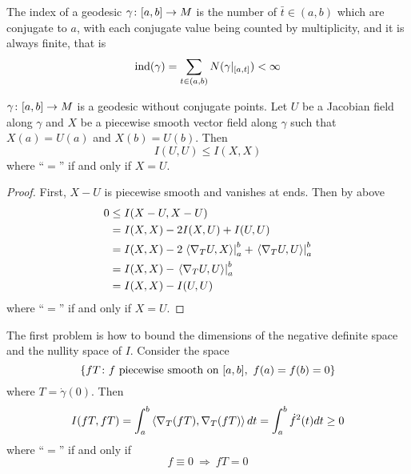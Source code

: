 \begin{enumerate}[label=\arabic{*}.]
	\begin{thm}\label{thm:morseindex}
		The index of a geodesic $\gamma \colon [a,b] \rightarrow M$ is the number of $\bar{t} \in (a,b)$ which are conjugate to $a$, with each conjugate value being counted by multiplicity, and it is always finite, that is
		\begin{equation*}
			\operatorname{ind}(\gamma) = \sum_{t \in (a,b)} N(\gamma|_{[a,t]}) < \infty
		\end{equation*}
	\end{thm}
	\begin{lem}\label{lem:indexlem}
		$\gamma \colon [a,b] \rightarrow M$ is a geodesic without conjugate points. Let $U$ be a Jacobian field along $\gamma$ and $X$ be a piecewise smooth vector field along $\gamma$ such that $X(a) = U(a)$ and $X(b) = U(b)$. Then
		\begin{equation*}
			I(U,U) \leq I(X,X)
		\end{equation*}
		where ``$=$'' if and only if $X = U$.
	\end{lem}
	\begin{proof}
		First, $X-U$ is piecewise smooth and vanishes at ends. Then by above
		\begin{equation*}
			\begin{aligned}
				0 &\leq I(X-U,X-U) \\
				&=I(X,X) - 2I(X,U)+I(U,U)\\
				&=I(X,X) - 2\left.\left\langle \nabla_TU,X \right\rangle\right\lvert_a^b + \left.\left\langle \nabla_TU,U \right\rangle\right\lvert_a^b \\
				&= I(X,X) - \left.\left\langle \nabla_TU,U \right\rangle\right\lvert_a^b \\
				&= I(X,X) - I(U,U)
			\end{aligned}
		\end{equation*}
		where ``$=$'' if and only if $X = U$.
	\end{proof}
	The first problem is how to bound the dimensions of the negative definite space and the nullity space of $I$. Consider the space
	\begin{equation*}
		\left\{fT \colon f \text{ piecewise smooth on }[a,b],~f(a)=f(b)=0\right\}
	\end{equation*}
	where $T = \dot{\gamma}(0)$. Then
	\begin{equation*}
		I(fT,fT) = \int_a^b \left\langle \nabla_T(fT),\nabla_T(fT) \right\rangle dt = \int_a^b \dot{f}^2(t)dt \geq 0
	\end{equation*}
	where ``$=$'' if and only if
	\begin{equation*}
		f \equiv 0 ~\Rightarrow~fT = 0
	\end{equation*}

\end{enumerate}
